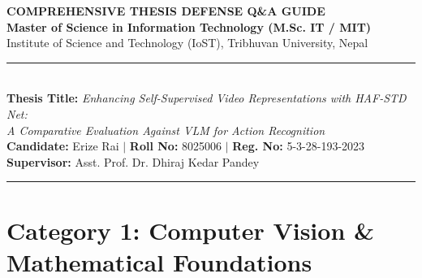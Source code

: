 \documentclass[a4paper, 11pt]{article}
\begin{document}
\begin{center}
  {\fontsize{18}{22}\selectfont \textbf{\color{primaryblue}COMPREHENSIVE THESIS DEFENSE Q\&A GUIDE}}\\[4pt]
  {\fontsize{13}{16}\selectfont \textbf{\color{accentdark}Master of Science in Information Technology (M.Sc. IT / MIT)}}\\[2pt]
  {\fontsize{11}{14}\selectfont Institute of Science and Technology (IoST), Tribhuvan University, Nepal}\\[6pt]
  \rule{\textwidth}{1.2pt}\\[6pt]
  {\fontsize{11}{14}\selectfont \textbf{Thesis Title:} \textit{Enhancing Self-Supervised Video Representations with HAF-STD Net:}}\\
  {\fontsize{11}{14}\selectfont \textit{A Comparative Evaluation Against VLM for Action Recognition}}\\[6pt]
  \textbf{Candidate:} Erize Rai \quad$|$ \quad \textbf{Roll No:} 8025006 \quad$|$ \quad \textbf{Reg. No:} 5-3-28-193-2023\\
  \textbf{Supervisor:} Asst. Prof. Dr. Dhiraj Kedar Pandey\\[2pt]
  \rule{\textwidth}{0.6pt}
\end{center}

\vspace{0.2cm}
\tableofcontents
\newpage

\section{Category 1: Computer Vision \& Mathematical Foundations}
\end{document}
